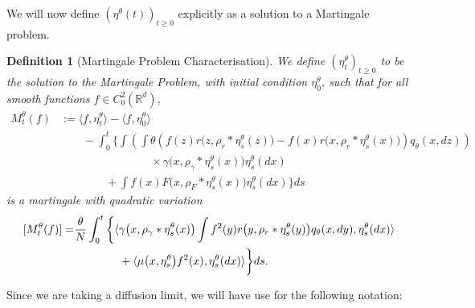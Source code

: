 \documentclass[12pt]{article}
\newtheorem{definition}[theorem]{Definition}
\begin{document}
We will now define $(\eta^{\theta}(t))_{t \geq 0}$
explicitly as a solution to a Martingale problem.

\begin{definition}[Martingale Problem Characterisation]
    \label{Def: Rescaled Models}
We define $(\eta^{\theta}_t)_{t \geq 0}$ to be the solution to the Martingale Problem,
with initial condition $\eta^{\theta}_0$,
such that for all smooth functions $f \in C^{2}_{0}(\mathbb{R}^d)$,
\begin{equation}
    \label{eq: Pre-limit Martingale Characterisation}
\begin{aligned}
M^{\theta}_t(f)
&:=  \langle f,\eta^{\theta}_t \rangle
        -\langle f,\eta^{\theta}_0 \rangle
 \\ &\qquad {}
 -  \int_{0}^{t}\bigg\{
        \int\left(   \int \theta
     \left(
        f(z)r\big(z,\rho_{r}*\eta^{\theta}_{s}(z)\big)
            -f(x)r\big(x,\rho_{r}*\eta^{\theta}_{s}(x)\big)
            \right)
                    q_\theta(x,dz)\right)
        \\ & \qquad \qquad \qquad \qquad {} \times
                            \gamma\big(x,\rho_{\gamma}*\eta^{\theta}_{s}(x)\big)
                            \eta^{\theta}_{s}(dx)
     \\ & \qquad \qquad {} +\int 
     f(x)F\big(x,\rho_{F}*\eta^{\theta}_{s}(x)\big)
     \eta^{\theta}_{s}(dx)
    \bigg\} ds
\end{aligned}    
\end{equation}
is a martingale with quadratic variation
\begin{equation}
\begin{aligned} \relax
[ M^{\theta}_t(f)] =& 
\frac{\theta}{N} \int_{0}^{t}\bigg\{
\langle \gamma\big(x,\rho_{\gamma}*\eta^{\theta}_{s}(x)\big)
\int f^2(y)r\big(y,\rho_{r}*\eta^{\theta}_{s}(y)\big)q_\theta(x,dy) 
,\eta^{\theta}_{s}(dx)\rangle\\
& \qquad \qquad +\langle \mu\big(x,\eta^{\theta}_{s}\big)f^2(x) 
,\eta^{\theta}_{s}(dx)\rangle \bigg\}ds. 
\end{aligned}    
\end{equation}


\end{definition}

Since we are taking a diffusion limit,
we will have use for the following notation:
\end{document}
